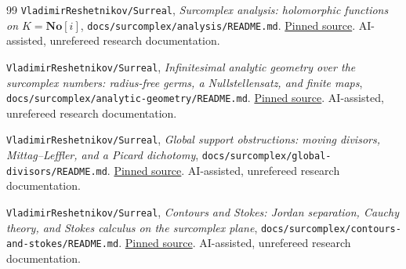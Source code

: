 \documentclass[11pt,letterpaper]{article}
\numberwithin{equation}{section}
\theoremstyle{definition}
\theoremstyle{remark}
\newcommand{\No}{\mathbf{No}}
\begin{document}
\begin{thebibliography}{99}
\texttt{VladimirReshetnikov/Surreal},
\emph{Surcomplex analysis: holomorphic functions on $K=\No[i]$},
\texttt{docs/surcomplex/analysis/README.md}.
\href{https://github.com/VladimirReshetnikov/Surreal/blob/39f2be6667ade51bca2b45daa47e289d69c09764/docs/surcomplex/analysis/README.md}{Pinned source}.
AI-assisted, unrefereed research documentation.

\texttt{VladimirReshetnikov/Surreal},
\emph{Infinitesimal analytic geometry over the surcomplex numbers:
radius-free germs, a Nullstellensatz, and finite maps},
\texttt{docs/surcomplex/analytic-geometry/README.md}.
\href{https://github.com/VladimirReshetnikov/Surreal/blob/39f2be6667ade51bca2b45daa47e289d69c09764/docs/surcomplex/analytic-geometry/README.md}{Pinned source}.
AI-assisted, unrefereed research documentation.

\texttt{VladimirReshetnikov/Surreal},
\emph{Global support obstructions: moving divisors, Mittag--Leffler, and a
Picard dichotomy},
\texttt{docs/surcomplex/global-divisors/README.md}.
\href{https://github.com/VladimirReshetnikov/Surreal/blob/39f2be6667ade51bca2b45daa47e289d69c09764/docs/surcomplex/global-divisors/README.md}{Pinned source}.
AI-assisted, unrefereed research documentation.

\texttt{VladimirReshetnikov/Surreal},
\emph{Contours and Stokes: Jordan separation, Cauchy theory, and Stokes
calculus on the surcomplex plane},
\texttt{docs/surcomplex/contours-and-stokes/README.md}.
\href{https://github.com/VladimirReshetnikov/Surreal/blob/39f2be6667ade51bca2b45daa47e289d69c09764/docs/surcomplex/contours-and-stokes/README.md}{Pinned source}.
AI-assisted, unrefereed research documentation.

\end{thebibliography}
\end{document}
